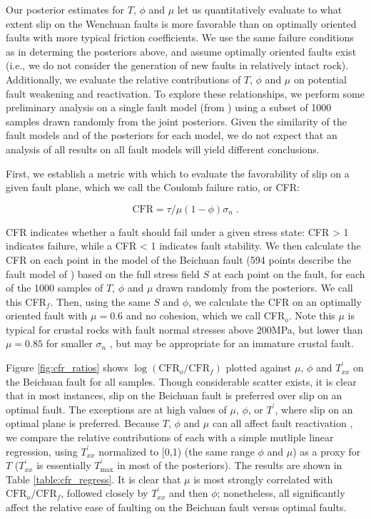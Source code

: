 \documentclass[twocolumn,jgrga]{AGUTeX}
\begin{document}
\begin{article}
Our posterior estimates for $T$, $\phi$ and $\mu$ let us quantitatively
evaluate to what extent slip on the Wenchuan faults is more favorable
than on optimally oriented faults with more typical friction
coefficients. We use the same failure conditions as in determing the
posteriors above, and assume optimally oriented faults exist
(i.e., we do not consider the generation of new faults in relatively 
intact rock).
Additionally, we evaluate the relative contributions of $T$, $\phi$ and
$\mu$ on potential fault weakening and reactivation. To explore these
relationships, we perform some preliminary analysis on a single fault
model (from \citet{zhang2011}) using a subset of 1000
samples drawn randomly from the joint posteriors. Given the similarity
of the fault models and of the posteriors for each model, we do not
expect that an analysis of all results on all fault models will yield
different conclusions.

First, we establish a metric with which to evaluate the favorability of
slip on a given fault plane, which we call the Coulomb failure ratio, or
CFR:

\begin{equation}
\mathrm{CFR} = \tau / \mu (1 - \phi) \sigma_n \; .
\label{eqn:cfr}
\end{equation}

CFR indicates whether a fault should fail under a given stress state:
CFR \textgreater{} 1 indicates failure, while a CFR \textless{} 1
indicates fault stability. We then calculate the CFR on each point in
the model of the Beichuan fault (594 points describe the fault model of
\citet{zhang2011}) based on the full stress field $S$ at
each point on the fault, for each of the 1000 samples of $T$, $\phi$ and
$\mu$ drawn randomly from the posteriors. We call this CFR$_f$. Then,
using the same $S$ and $\phi$, we calculate the CFR on an optimally
oriented fault with $\mu=0.6$ and no cohesion, which we call CFR$_o$.
Note this $\mu$ is typical for crustal rocks with fault normal stresses
above 200MPa, but lower than $\mu = 0.85$ for smaller $\sigma_n$
\citep{byerlee1978}, but may be appropriate for an immature crustal
fault.

Figure \ref{fig:cfr_ratios} shows
$\log (\mathrm{CFR}_o / \mathrm{CFR}_f)$ plotted against $\mu$, $\phi$
and $T^\prime_{xx}$ on the Beichuan fault for all samples. Though
considerable scatter exists, it is clear that in most instances, slip on
the Beichuan fault is preferred over slip on an optimal fault. The
exceptions are at high values of $\mu$, $\phi$, or $T^\prime$, where
slip on an optimal plane is preferred. Because $T$, $\phi$ and $\mu$ can
all affect fault reactivation \citep[e.g.,][]{sibson1985}, we compare the
relative contributions of each with a simple mutliple linear regression,
using $T^\prime_{xx}$ normalized to [0,1) (the same range $\phi$ and
$\mu$) as a proxy for $T$ ($T^\prime_{xx}$ is essentially
$T^\prime_{\mathrm{max}}$ in most of the posteriors). The results are
shown in Table \ref{table:cfr_regress}. It is clear that $\mu$ is most
strongly correlated with $\mathrm{CFR}_o/\mathrm{CFR}_f$, followed
closely by $T^\prime_{xx}$ and then $\phi$; nonetheless, all
significantly affect the relative ease of faulting on the Beichuan fault
versus optimal faults.


\end{article}
\end{document}
